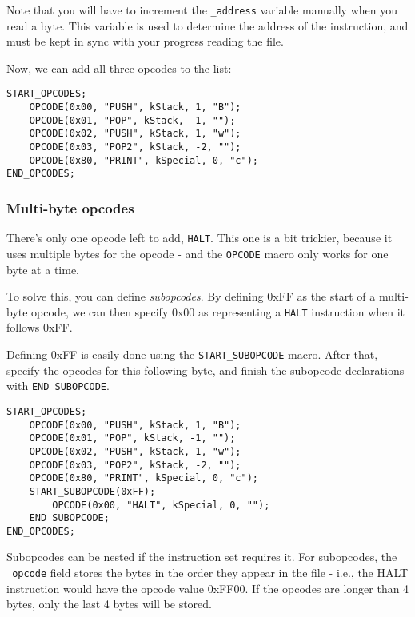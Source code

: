Note that you will have to increment the \verb+_address+ variable manually when you read a byte. This variable is used to determine the address of the instruction, and must be kept in sync with your progress reading the file.

Now, we can add all three opcodes to the list:

\begin{C++}
\begin{lstlisting}
START_OPCODES;
	OPCODE(0x00, "PUSH", kStack, 1, "B");
	OPCODE(0x01, "POP", kStack, -1, "");
	OPCODE(0x02, "PUSH", kStack, 1, "w");
	OPCODE(0x03, "POP2", kStack, -2, "");
	OPCODE(0x80, "PRINT", kSpecial, 0, "c");
END_OPCODES;
\end{lstlisting}
\end{C++}

\subsubsection{Multi-byte opcodes}
There's only one opcode left to add, \verb+HALT+. This one is a bit trickier, because it uses multiple bytes for the opcode - and the \verb+OPCODE+ macro only works for one byte at a time.

To solve this, you can define \emph{subopcodes}. By defining 0xFF as the start of a multi-byte opcode, we can then specify 0x00 as representing a \verb+HALT+ instruction when it follows 0xFF.

Defining 0xFF is easily done using the \verb+START_SUBOPCODE+ macro. After that, specify the opcodes for this following byte, and finish the subopcode declarations with \verb+END_SUBOPCODE+.

\begin{C++}
\begin{lstlisting}
START_OPCODES;
	OPCODE(0x00, "PUSH", kStack, 1, "B");
	OPCODE(0x01, "POP", kStack, -1, "");
	OPCODE(0x02, "PUSH", kStack, 1, "w");
	OPCODE(0x03, "POP2", kStack, -2, "");
	OPCODE(0x80, "PRINT", kSpecial, 0, "c");
	START_SUBOPCODE(0xFF);
		OPCODE(0x00, "HALT", kSpecial, 0, "");
	END_SUBOPCODE;
END_OPCODES;
\end{lstlisting}
\end{C++}

Subopcodes can be nested if the instruction set requires it. For subopcodes, the \verb+_opcode+ field stores the bytes in the order they appear in the file - i.e., the HALT instruction would have the opcode value 0xFF00. If the opcodes are longer than 4 bytes, only the last 4 bytes will be stored.

